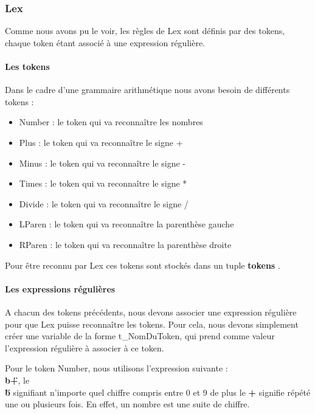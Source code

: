 \documentclass[a4paper,12pt]{article}
\begin{document}
		\subsubsection{Lex}
			
			Comme nous avons pu le voir, les règles de Lex sont définis par des tokens, chaque token étant associé à une expression régulière. 

			\paragraph{Les tokens}

				Dans le cadre d'une grammaire arithmétique nous avons besoin de différents tokens : 
				\begin{itemize}
					\item Number : le token qui va reconnaître les nombres
					\item Plus : le token qui va reconnaître le signe +
					\item Minus : le token qui va reconnaître le signe -
					\item Times : le token qui va reconnaître le signe *
					\item Divide : le token qui va reconnaître le signe /
					\item LParen : le token qui va reconnaître la parenthèse gauche
					\item RParen : le token qui va reconnaître la parenthèse droite
				\end{itemize}

				Pour être reconnu par Lex ces tokens sont stockés dans un tuple \textbf{tokens} .

			\paragraph{Les expressions régulières}

				A chacun des tokens précédents, nous devons associer une expression régulière pour que Lex puisse reconnaître les tokens.
				Pour cela, nous devons simplement créer une variable de la forme t\_NomDuToken, qui prend comme valeur l'expression régulière à associer à ce token.

				Pour le token Number, nous utilisons l'expression suivante : \textbf{\"\\b+\"}, le \textbf{\"\\b\"} signifiant n'importe quel chiffre compris entre 0 et 9 de plus le \textbf{+} signifie répété une ou plusieurs fois. En effet, un nombre est une suite de chiffre.
\end{document}
